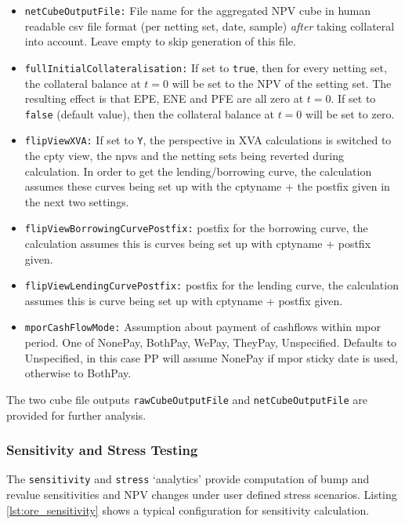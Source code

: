 \begin{itemize}
sample), leave empty to skip generation of this file.
\item {\tt netCubeOutputFile:} File name for the aggregated NPV cube in human readable csv file format (per netting set,
date, sample) {\em after} taking collateral into account. Leave empty to skip generation of this file.
\item {\tt fullInitialCollateralisation:} If set to {\tt true}, then for every netting set, the collateral balance at $t=0$ will be set to the NPV of the setting set. The resulting effect is that EPE, ENE and PFE are all zero at $t=0$. If set to {\tt false} (default value), then the collateral balance at $t=0$ will be set to zero.
\item {\tt flipViewXVA:} If set to {\tt Y}, the perspective in XVA calculations is switched to the cpty view, the npvs and the netting sets being reverted during calculation. In order to get the lending/borrowing curve, the calculation assumes these curves being set up with the cptyname + the postfix given in the next two settings.
\item {\tt flipViewBorrowingCurvePostfix:} postfix for the borrowing curve, the calculation assumes this is curves being set up with cptyname + postfix given.
\item {\tt flipViewLendingCurvePostfix:} postfix for the lending curve, the calculation assumes this is curve being set up with cptyname + postfix given.
\item {\tt mporCashFlowMode:} Assumption about payment of cashflows within mpor period. One of NonePay, BothPay, WePay,
  TheyPay, Unspecified. Defaults to Unspecified, in this case PP will assume NonePay if mpor sticky date is used,
  otherwise to BothPay.
\end{itemize}

The two cube file outputs {\tt rawCubeOutputFile} and {\tt netCubeOutputFile} are provided for further analysis.

\subsubsection{Sensitivity and Stress Testing}

The {\tt sensitivity} and {\tt stress} `analytics' provide computation of bump and revalue
sensitivities and NPV changes under user defined stress scenarios. Listing \ref{lst:ore_sensitivity}
shows a typical configuration for sensitivity calculation.

